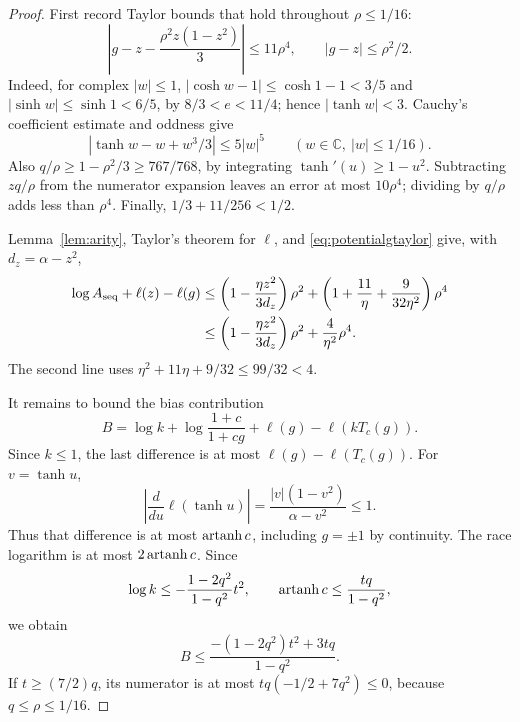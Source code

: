 \begin{proof}
First record Taylor bounds that hold throughout \(\rho\le1/16\):
\begin{equation}\label{eq:potentialgtaylor}
\left|g-z-\frac{\rho^2z(1-z^2)}3\right|\le11\rho^4,
\qquad |g-z|\le\rho^2/2.
\end{equation}
Indeed, for complex \(|w|\le1\),
\(|\cosh w-1|\le\cosh1-1<3/5\) and
\(|\sinh w|\le\sinh1<6/5\), by \(8/3<e<11/4\); hence
\(|\tanh w|<3\). Cauchy's coefficient estimate and oddness give
\begin{equation}\label{eq:tanhfifth}
|\tanh w-w+w^3/3|\le5|w|^5\qquad(w\in\mathbb C,\ |w|\le1/16).
\end{equation}
Also
\(q/\rho\ge1-\rho^2/3\ge767/768\), by integrating
\(\tanh'(u)\ge1-u^2\). Subtracting \(zq/\rho\) from the
numerator expansion leaves an error at most \(10\rho^4\);
dividing by \(q/\rho\) adds less than \(\rho^4\).
Finally, \(1/3+11/256<1/2\).

Lemma~\ref{lem:arity}, Taylor's theorem for \(\ell\), and
\eqref{eq:potentialgtaylor} give, with \(d_z=\alpha-z^2\),
\begin{align}
\log A_{\rm seq}+\ell(z)-\ell(g)
&\le\left(1-\frac{\eta z^2}{3d_z}\right)\rho^2
 +\left(1+\frac{11}\eta+\frac9{32\eta^2}\right)\rho^4\notag\\
&\le\left(1-\frac{\eta z^2}{3d_z}\right)\rho^2
 +\frac4{\eta^2}\rho^4.\label{eq:potentialmajority}
\end{align}
The second line uses
\(\eta^2+11\eta+9/32\le99/32<4\).

It remains to bound the bias contribution
\[
B=\log k+\log\frac{1+c}{1+cg}+\ell(g)-\ell(kT_c(g)).
\]
Since \(k\le1\), the last difference
is at most \(\ell(g)-\ell(T_c(g))\). For \(v=\tanh u\),
\[
\left|\frac{d}{du}\ell(\tanh u)\right|
=\frac{|v|(1-v^2)}{\alpha-v^2}\le1.
\]
Thus that difference is at most \(\operatorname{artanh} c\), including
\(g=\pm1\) by continuity. The race logarithm is at most
\(2\operatorname{artanh} c\). Since
\[
\log k\le-\frac{1-2q^2}{1-q^2}t^2,
\qquad \operatorname{artanh} c\le\frac{tq}{1-q^2},
\]
we obtain
\[
B\le\frac{-(1-2q^2)t^2+3tq}{1-q^2}.
\]
If \(t\ge(7/2)q\), its numerator is at most
\(tq(-1/2+7q^2)\le0\), because \(q\le\rho\le1/16\).

\end{proof}

